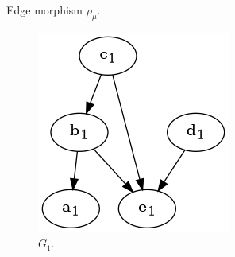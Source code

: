 \begin{frame}
\begin{figure}[htbp]
\begin{subfigure}[t]{0.20\textwidth}
			\caption{Edge morphism $\rho_{\mu}$.}
		\end{subfigure}
		\quad
		\begin{subfigure}[t]{0.18\textwidth}
			\begin{subfigure}[t]{\textwidth}
				\centering
				\includegraphics[width=\linewidth,valign=t]{inc/fuzzy_graph_theory/fuzzy_graph_morphism_G1.png}
				\caption{$G_1$.}
			\end{subfigure}
			\begin{subfigure}[t]{0.8\textwidth}
				\centering

\end{subfigure}
\end{subfigure}
\end{figure}
\end{frame}
